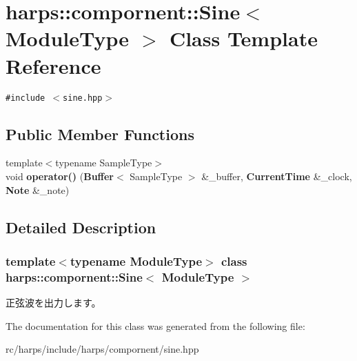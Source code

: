 \section{harps::compornent::Sine$<$ ModuleType $>$ Class Template Reference}
\label{classharps_1_1compornent_1_1Sine}
{\tt \#include $<$sine.hpp$>$}

\subsection*{Public Member Functions}
\begin{CompactItemize}
\item 
{\footnotesize template$<$typename SampleType$>$ }\\void \textbf{operator()} ({\bf Buffer}$<$ SampleType $>$ \&\_\-buffer, {\bf CurrentTime} \&\_\-clock, {\bf Note} \&\_\-note)\label{classharps_1_1compornent_1_1Sine_9faa8a1827d599007c30037e7f15b56b}

\end{CompactItemize}


\subsection{Detailed Description}
\subsubsection*{template$<$typename ModuleType$>$ class harps::compornent::Sine$<$ ModuleType $>$}

正弦波を出力します。 

The documentation for this class was generated from the following file:\begin{CompactItemize}
\item 
rc/harps/include/harps/compornent/sine.hpp\end{CompactItemize}
